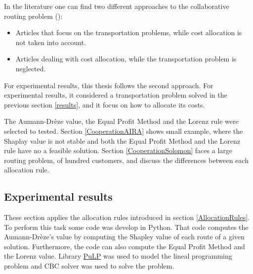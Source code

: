 In the literature one can find two different approaches to the collaborative routing problem (\cite{Gansterer}):
\begin{itemize}
	\item Articles that focus on the transportation problems, while cost allocation is not taken
	into account.
	\item Articles dealing with cost allocation, while the transportation problem is neglected.
\end{itemize}	

For experimental results, this thesis follows the second approach. For experimental results, it considered a transportation problem solved in the previous section \ref{results}, and it focus on how to allocate its costs.

The Aumann-Dr\`eze value, the Equal Profit Method and the Lorenz rule were selected to tested. Section \ref{CooperationAIRA} shows small example, where the Shaplay value is not stable and both the Equal Profit Method and the Lorenz rule have no a feasible solution. Section \ref{CooperationSolomon} faces a large routing problem, of hundred customers, and discuss the differences between each allocation rule.



\subsection{Experimental results}\label{GameTheoryResults}

These section applies the allocation rules introduced in section \ref{AllocationRules}. To perform this task some code was develop in Python. That code computes the Aumann-Dr\`eze's value by computing the Shapley value of each route of a given solution. Furthermore, the code can also compute the Equal Profit Method and the Lorenz value. Library \href{https://pypi.org/project/PuLP/}{PuLP} was used to model the lineal programming problem and CBC solver was used to solve the problem.

